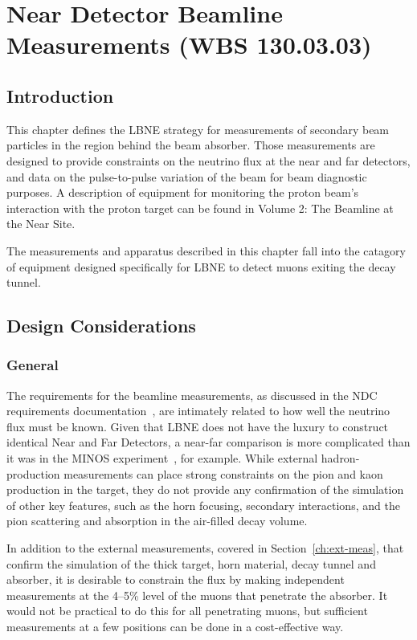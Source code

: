 \chapter{Near Detector Beamline Measurements (WBS 130.03.03)}
\label{ch:blm}


\section{Introduction}

This chapter defines the LBNE strategy for measurements of secondary
beam particles in the region behind the beam absorber. 
Those measurements are designed to provide constraints 
on the neutrino flux at the near and far
detectors, and data on the pulse-to-pulse variation
of the beam for beam diagnostic purposes. A description of equipment
for monitoring the proton beam's interaction with the proton target
can be found in Volume 2: The Beamline at the Near Site. 

The measurements and apparatus described in this chapter fall into
the catagory of equipment designed specifically for LBNE to
detect muons exiting the decay tunnel. 

\section{Design Considerations}
\label{v3ch3-design-consid}

\subsection{General}
The requirements for the beamline measurements, 
as discussed in the NDC requirements documentation~\cite{nd_requirements_doc}, are intimately related to how well the neutrino flux must be known.
Given that LBNE does not have the luxury to construct identical Near and Far Detectors, 
a near-far comparison is more complicated than it was in
the MINOS experiment~\cite{gnumi-validation}, for example.   
While external hadron-production measurements can place strong constraints on the pion and kaon production in the target,
they do not provide any confirmation of the simulation of other key features, such as the horn focusing, secondary interactions, and the pion scattering and absorption in the air-filled decay volume. 

In addition to the external measurements, covered in Section~\ref{ch:ext-meas}, 
that confirm
the simulation of the thick target, horn material, decay tunnel and
absorber, it is desirable to constrain the flux by making independent
measurements at the 4--5\%
level of the muons that penetrate the absorber. It would not be practical to do this for all penetrating
muons, but sufficient measurements at a few positions can be done in a 
cost-effective way. 

